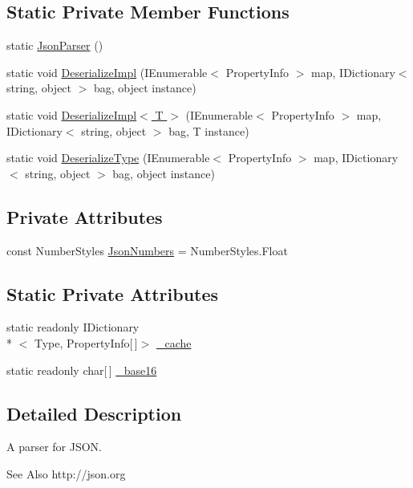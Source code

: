 \subsection*{Static Private Member Functions}
\begin{DoxyCompactItemize}
\item 
static \hyperlink{a00060_a1544c040c7ea06b664fdc4860a2f9bf8}{Json\-Parser} ()
\item 
static void \hyperlink{a00060_a67dcda2f39de7721d92a69dc4191f664}{Deserialize\-Impl} (I\-Enumerable$<$ Property\-Info $>$ map, I\-Dictionary$<$ string, object $>$ bag, object instance)
\item 
static void \hyperlink{a00060_a2630a01783ba0cda2e4e29c922951a66}{Deserialize\-Impl$<$ T $>$} (I\-Enumerable$<$ Property\-Info $>$ map, I\-Dictionary$<$ string, object $>$ bag, T instance)
\item 
static void \hyperlink{a00060_a551f727b71d49c59cd7a101790764e5b}{Deserialize\-Type} (I\-Enumerable$<$ Property\-Info $>$ map, I\-Dictionary$<$ string, object $>$ bag, object instance)
\end{DoxyCompactItemize}
\subsection*{Private Attributes}
\begin{DoxyCompactItemize}
\item 
const Number\-Styles \hyperlink{a00060_ad05db33540abe9864b13b6b5c637a354}{Json\-Numbers} = Number\-Styles.\-Float
\end{DoxyCompactItemize}
\subsection*{Static Private Attributes}
\begin{DoxyCompactItemize}
\item 
static readonly I\-Dictionary\\*
$<$ Type, Property\-Info\mbox{[}$\,$\mbox{]}$>$ \hyperlink{a00060_ae6f928a5caa81742eb3bac3e986f92f6}{\-\_\-cache}
\item 
static readonly char\mbox{[}$\,$\mbox{]} \hyperlink{a00060_a9d97f297996ac634f58dd842ebc00171}{\-\_\-base16}
\end{DoxyCompactItemize}


\subsection{Detailed Description}
A parser for J\-S\-O\-N. \begin{DoxySeeAlso}{See Also}
http\-://json.\-org


\end{DoxySeeAlso}




